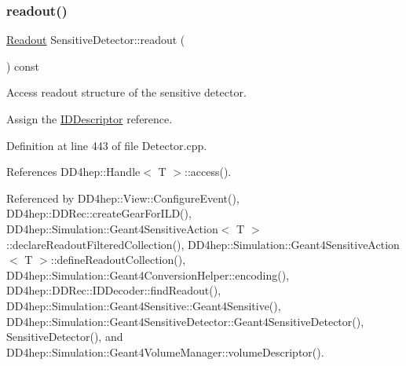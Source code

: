 \hypertarget{class_d_d4hep_1_1_geometry_1_1_sensitive_detector_ad79f39c5b360f7ecf2341de990131eb2}{}\label{class_d_d4hep_1_1_geometry_1_1_sensitive_detector_ad79f39c5b360f7ecf2341de990131eb2} 
\subsubsection{\texorpdfstring{readout()}{readout()}}
{\footnotesize\ttfamily \hyperlink{class_d_d4hep_1_1_geometry_1_1_readout}{Readout} Sensitive\+Detector\+::readout (\begin{DoxyParamCaption}{ }\end{DoxyParamCaption}) const}



Access readout structure of the sensitive detector. 

Assign the \hyperlink{class_d_d4hep_1_1_geometry_1_1_i_d_descriptor}{I\+D\+Descriptor} reference. 

Definition at line 443 of file Detector.\+cpp.



References D\+D4hep\+::\+Handle$<$ T $>$\+::access().



Referenced by D\+D4hep\+::\+View\+::\+Configure\+Event(), D\+D4hep\+::\+D\+D\+Rec\+::create\+Gear\+For\+I\+L\+D(), D\+D4hep\+::\+Simulation\+::\+Geant4\+Sensitive\+Action$<$ T $>$\+::declare\+Readout\+Filtered\+Collection(), D\+D4hep\+::\+Simulation\+::\+Geant4\+Sensitive\+Action$<$ T $>$\+::define\+Readout\+Collection(), D\+D4hep\+::\+Simulation\+::\+Geant4\+Conversion\+Helper\+::encoding(), D\+D4hep\+::\+D\+D\+Rec\+::\+I\+D\+Decoder\+::find\+Readout(), D\+D4hep\+::\+Simulation\+::\+Geant4\+Sensitive\+::\+Geant4\+Sensitive(), D\+D4hep\+::\+Simulation\+::\+Geant4\+Sensitive\+Detector\+::\+Geant4\+Sensitive\+Detector(), Sensitive\+Detector(), and D\+D4hep\+::\+Simulation\+::\+Geant4\+Volume\+Manager\+::volume\+Descriptor().

\hypertarget{class_d_d4hep_1_1_geometry_1_1_sensitive_detector_a2dc0653c5940496cd8931f75cb4f0d48}{}\label{class_d_d4hep_1_1_geometry_1_1_sensitive_detector_a2dc0653c5940496cd8931f75cb4f0d48} 
